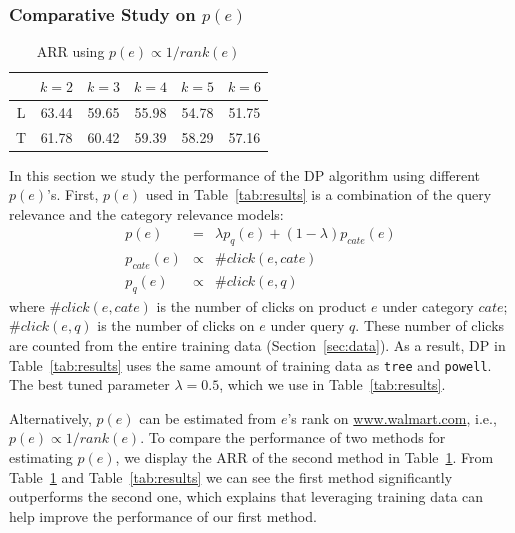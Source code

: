 \subsubsection{Comparative Study on $p(e)$} 
\label{sec:comparepe}

\begin{table}[ht]
\centering
\begin{tabular}{|c|c|c|c|c|c|}
\hline
   & $k=2$ & $k=3$ & $k=4$ & $k=5$ & $k=6$\\
\hline
L & 63.44 & 59.65 & 55.98 & 54.78 & 51.75\\ \hline
T &  61.78& 60.42 & 59.39 & 58.29 & 57.16\\ \hline
\end{tabular}
\caption{ARR using $p(e)\propto 1/rank(e)$\label{tab:dp}}
\vspace{-0.1in}
\end{table}

In this section we study the performance of the DP algorithm using different $p(e)$'s. First, $p(e)$ used in Table~\ref{tab:results} is a combination of the query relevance and the category relevance models:
\begin{eqnarray*}
p(e) &=& \lambda p_q(e) + (1-\lambda) p_{cate}(e)\label{eq:mle}\\
p_{cate}(e) &\propto& \#click(e, cate)\nonumber\\
p_{q}(e) &\propto& \#click(e, q)\nonumber
\end{eqnarray*}
where $\#click(e, cate)$ is the number of clicks on product $e$ under category $cate$; $\#click(e, q)$ is the number of clicks on $e$ under query $q$. These number of clicks are counted from the entire training data (Section~\ref{sec:data}). As a result, DP in Table~\ref{tab:results} uses the same amount of training data as \texttt{tree} and \texttt{powell}. The best tuned parameter $\lambda = 0.5$, which we use in Table~\ref{tab:results}.

Alternatively, $p(e)$ can be estimated from $e$'s rank on \url{www.walmart.com}, i.e., $p(e)\propto 1/rank(e)$. To compare the performance of two methods for estimating $p(e)$, we display the ARR of the second method in Table~\ref{tab:dp}. From Table~\ref{tab:dp} and Table~\ref{tab:results} we can see the first method significantly outperforms the second one, which explains that leveraging training data can help improve the performance of our first method.

